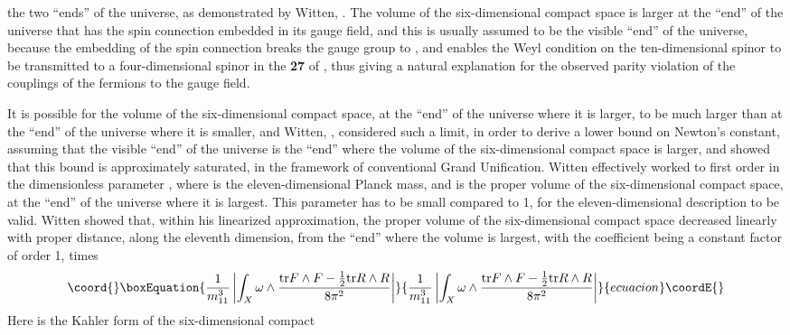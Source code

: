 \documentclass[a4paper,12pt,oneside]{article}
\begin{document}
the two ``ends'' of the universe, as demonstrated by Witten,
\cite{Witten}.  The volume of the six-dimensional compact space is 
larger at the ``end'' of the universe
that has the spin connection embedded in its \coordHE{} gauge
field, and this is usually assumed to be the visible ``end'' of the
universe, because the embedding of the spin connection breaks the
\coordHE{} gauge group to \coordHE{}, and enables the Weyl
condition on the ten-dimensional spinor to be transmitted to a
four-dimensional spinor in the \textbf{27} of \coordHE{}, thus
giving a natural explanation for the observed parity violation of
the couplings of the fermions to the \coordHE{} gauge field.  

It is possible for the volume of the six-dimensional compact
space, at the ``end'' of the universe where it is larger, to be 
much larger than at the ``end'' of the universe where it is smaller,
and Witten, \cite{Witten}, considered such a limit, in order to
derive a lower bound on Newton's constant, assuming that the 
visible ``end'' of the universe is the ``end'' where the volume of 
the six-dimensional compact space is larger, and showed that this 
bound is approximately saturated, in the framework of conventional 
Grand Unification.  Witten effectively worked to first order in the 
dimensionless parameter \coordHE{}, where \coordHE{}
is the eleven-dimensional Planck mass, and \coordHE{} is the proper
volume of the six-dimensional compact space, at the ``end'' of the 
universe where it is largest.  This parameter has to
be small compared to 1, for the eleven-dimensional description to be
valid.  Witten showed that, within his linearized approximation, the
proper volume of the six-dimensional compact space decreased 
linearly with proper distance, along the eleventh dimension, from 
the ``end'' where the volume is largest, with the coefficient being 
a constant factor of order 1, times
\begin{equation}\coord{}\boxEquation{\label{volume decrease coefficient}
\frac{1}{m_{11}^3}\left\vert\int_X\omega\wedge\frac{\mathrm{tr}F
\wedge F - \frac{1}{2}\mathrm{tr}R\wedge R}{8\pi^2}\right\vert
}{\frac{1}{m_{11}^3}\left\vert\int_X\omega\wedge\frac{\mathrm{tr}F
\wedge F - \frac{1}{2}\mathrm{tr}R\wedge R}{8\pi^2}\right\vert
}{ecuacion}\coordE{}\end{equation}
Here \myHighlight{$\omega$}\coordHE{} is the Kahler form of the six-dimensional compact 
\end{document}
